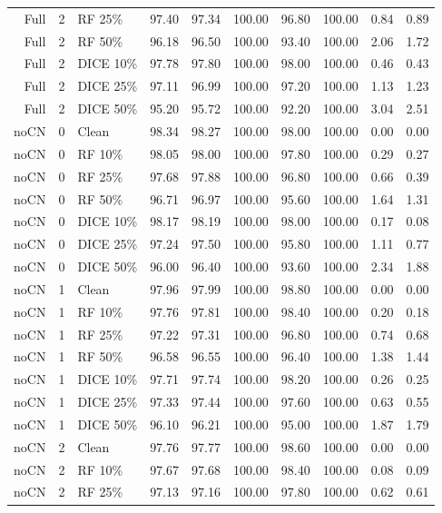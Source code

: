{\begin{longtable}{rllrrrrrrr}
Full & 2 & RF 25\% & 97.40 & 97.34 & 100.00 & 96.80 & 100.00 & 0.84 & 0.89 \\
Full & 2 & RF 50\% & 96.18 & 96.50 & 100.00 & 93.40 & 100.00 & 2.06 & 1.72 \\
Full & 2 & DICE 10\% & 97.78 & 97.80 & 100.00 & 98.00 & 100.00 & 0.46 & 0.43 \\
Full & 2 & DICE 25\% & 97.11 & 96.99 & 100.00 & 97.20 & 100.00 & 1.13 & 1.23 \\
Full & 2 & DICE 50\% & 95.20 & 95.72 & 100.00 & 92.20 & 100.00 & 3.04 & 2.51 \\
noCN & 0 & Clean & 98.34 & 98.27 & 100.00 & 98.00 & 100.00 & 0.00 & 0.00 \\
noCN & 0 & RF 10\% & 98.05 & 98.00 & 100.00 & 97.80 & 100.00 & 0.29 & 0.27 \\
noCN & 0 & RF 25\% & 97.68 & 97.88 & 100.00 & 96.80 & 100.00 & 0.66 & 0.39 \\
noCN & 0 & RF 50\% & 96.71 & 96.97 & 100.00 & 95.60 & 100.00 & 1.64 & 1.31 \\
noCN & 0 & DICE 10\% & 98.17 & 98.19 & 100.00 & 98.00 & 100.00 & 0.17 & 0.08 \\
noCN & 0 & DICE 25\% & 97.24 & 97.50 & 100.00 & 95.80 & 100.00 & 1.11 & 0.77 \\
noCN & 0 & DICE 50\% & 96.00 & 96.40 & 100.00 & 93.60 & 100.00 & 2.34 & 1.88 \\
noCN & 1 & Clean & 97.96 & 97.99 & 100.00 & 98.80 & 100.00 & 0.00 & 0.00 \\
noCN & 1 & RF 10\% & 97.76 & 97.81 & 100.00 & 98.40 & 100.00 & 0.20 & 0.18 \\
noCN & 1 & RF 25\% & 97.22 & 97.31 & 100.00 & 96.80 & 100.00 & 0.74 & 0.68 \\
noCN & 1 & RF 50\% & 96.58 & 96.55 & 100.00 & 96.40 & 100.00 & 1.38 & 1.44 \\
noCN & 1 & DICE 10\% & 97.71 & 97.74 & 100.00 & 98.20 & 100.00 & 0.26 & 0.25 \\
noCN & 1 & DICE 25\% & 97.33 & 97.44 & 100.00 & 97.60 & 100.00 & 0.63 & 0.55 \\
noCN & 1 & DICE 50\% & 96.10 & 96.21 & 100.00 & 95.00 & 100.00 & 1.87 & 1.79 \\
noCN & 2 & Clean & 97.76 & 97.77 & 100.00 & 98.60 & 100.00 & 0.00 & 0.00 \\
noCN & 2 & RF 10\% & 97.67 & 97.68 & 100.00 & 98.40 & 100.00 & 0.08 & 0.09 \\
noCN & 2 & RF 25\% & 97.13 & 97.16 & 100.00 & 97.80 & 100.00 & 0.62 & 0.61 \\

\end{longtable}}
